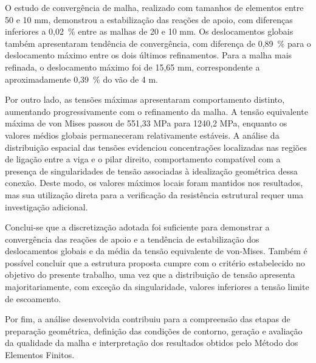 \documentclass[a4paper, 12pt]{article}
\begin{document}
O estudo de convergência de malha, realizado com tamanhos de elementos entre 50 e 10 mm, demonstrou a estabilização das reações de apoio, com diferenças inferiores a 0,02~\% entre as malhas de 20 e 10 mm. Os deslocamentos globais também apresentaram tendência de convergência, com diferença de 0,89~\% para o deslocamento máximo entre os dois últimos refinamentos. Para a malha mais refinada, o deslocamento máximo foi de 15,65 mm, correspondente a aproximadamente 0,39~\% do vão de 4 m.

Por outro lado, as tensões máximas apresentaram comportamento distinto, aumentando progressivamente com o refinamento da malha. A tensão equivalente máxima de von Mises passou de 551,33 MPa para 1240,2 MPa, enquanto os valores médios globais permaneceram relativamente estáveis. A análise da distribuição espacial das tensões evidenciou concentrações localizadas nas regiões de ligação entre a viga e o pilar direito, comportamento compatível com a presença de singularidades de tensão associadas à idealização geométrica dessa conexão. Deste modo, os valores máximos locais foram mantidos nos resultados, mas sua utilização direta para a verificação da resistência estrutural requer uma investigação adicional.

Conclui-se que a discretização adotada foi suficiente para demonstrar a convergência das reações de apoio e a tendência de estabilização dos deslocamentos globais e da média da tensão equivalente de von-Mises. Também é possível concluir que a estrutura proposta cumpre com o critério estabelecido no objetivo do presente trabalho, uma vez que a distribuição de tensão apresenta majoritariamente, com exceção da singularidade, valores inferiores a tensão limite de escoamento.

Por fim, a análise desenvolvida contribuiu para a compreensão das etapas de preparação geométrica, definição das condições de contorno, geração e avaliação da qualidade da malha e interpretação dos resultados obtidos pelo Método dos Elementos Finitos. 

\printbibliography[heading=bibintoc,title={Referências}]
\end{document}
